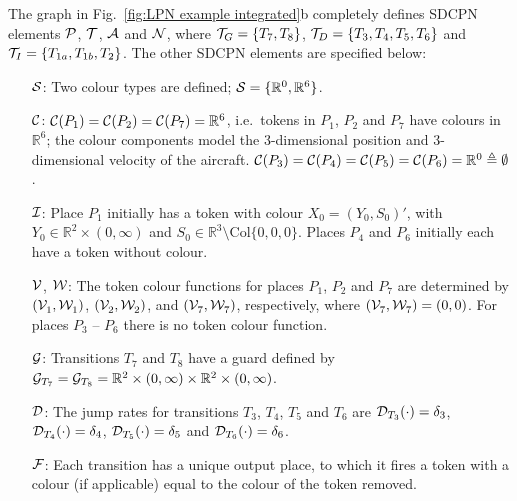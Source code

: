 \documentclass[copyright,creativecommons]{eptcs}
\begin{document}
The graph in Fig.\ \ref{fig:LPN example integrated}b completely
defines SDCPN elements ${\cal P}$, ${\cal T}$, ${\cal A}$ and
${\cal N}$, where ${\cal T}_G = \{T_7, T_8\}$, ${\cal T}_D =
\{T_3, T_4, T_5, T_6\}$ and ${\cal T}_I = \{T_{1a}, T_{1b},
T_{2}\}$. The other SDCPN elements are specified below:
\begin{itemize}
\item[${\cal S}$:] Two colour types are defined; ${\cal S} =
\{\mathbb{R}^0, \mathbb{R}^6\}$.

\item[${\cal C}$:] ${\cal C}(P_1) = {\cal C}(P_2) = {\cal C}(P_7)
= \mathbb{R}^6$, i.e.\
                   tokens in $P_1$, $P_2$ and $P_7$ have colours in $\mathbb{R}^6$;
                   the colour components model the 3-dimensional position
                   and 3-dimensional velocity of the aircraft. ${\cal C}(P_3) = {\cal C}(P_4)
                   = {\cal C}(P_5) = {\cal C}(P_6) =\mathbb{R}^0 \triangleq \emptyset$.

\item[${\cal I}$:] Place $P_1$ initially has a token with colour
$X_0 =
                   (Y_0, S_0)'$, with $Y_0 \in \mathbb{R}^2 \times (0,\infty)$
                   and $S_0 \in \mathbb{R}^3 \setminus \mbox{Col}\{0,0,0\}$.
                   Places $P_4$ and $P_6$ initially each have a token without
                   colour.

\item[${\cal V}$,] ${\cal W}$: The token colour functions for
places $P_1$, $P_2$ and
                   $P_7$ are determined by
                   $({\cal V}_{1}^{}, {\cal W}_1^{})$,
                   $({\cal V}_{2}^{}, {\cal W}_2^{})$, and
                   $({\cal V}_{7}^{}, {\cal W}_7^{})$, respectively, where
                   $({\cal V}_{7}^{}, {\cal W}_7^{})=(0,0)$.
                   For places $P_3$ -- $P_6$ there is no token colour function.

\item[${\cal G}$:] Transitions $T_7$ and $T_8$ have a guard
                   defined by ${\cal G}_{T_7} = {\cal G}_{T_8} =
                   \mathbb{R}^2 \times (0, \infty) \times \mathbb{R}^2
                   \times (0, \infty)$.

\item[${\cal D}$:] The jump rates for transitions $T_3$, $T_4$,
$T_5$ and
                   $T_6$ are ${\cal D}_{T_3}(\cdot) = \delta_3$,
                   ${\cal D}_{T_4}(\cdot) = \delta_4$, ${\cal D}_{T_5}(\cdot) =
                   \delta_5$ and ${\cal D}_{T_6}(\cdot) = \delta_6$.

\item[${\cal F}$:] Each transition has a unique output place, to
which it
                   fires a token with a colour (if applicable) equal to the
                   colour of the token removed.

\end{itemize}
\end{document}
